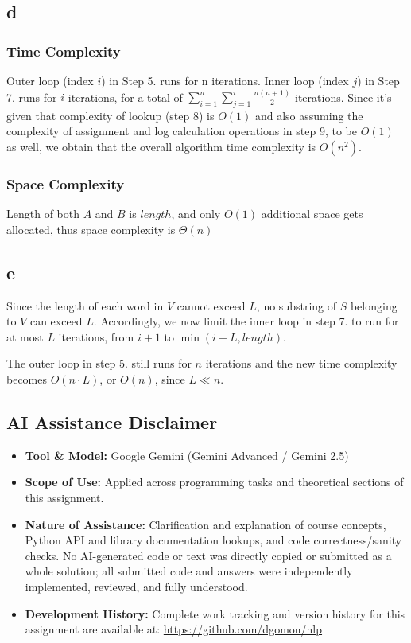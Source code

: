 \documentclass{article}
\numberwithin{equation}{section}
\begin{document}
    \subsection*{d}
    \subsubsection*{Time Complexity}
    Outer loop (index $i$) in Step 5. runs for n iterations.
    Inner loop (index $j$) in Step 7. runs for $i$ iterations, for a total of $\sum_{i = 1}^{n}\sum_{j = 1}^{i} \frac{n(n+1)}{2}$ iterations.
    Since it's given that complexity of lookup (step 8) is $O(1)$ and also assuming the complexity of assignment and
    log calculation operations in step 9, to be $O(1)$ as well, we obtain that the overall algorithm time complexity is $O(n^2)$.

    \subsubsection*{Space Complexity}
    Length of both $A$ and $B$ is $length$, and only $O(1)$ additional space gets allocated, thus space complexity is $\Theta(n)$

    \subsection*{e}
    Since the length of each word in $V$ cannot exceed $L$, no substring of $S$ belonging to $V$ can exceed $L$.
    Accordingly, we now limit the inner loop in step 7. to run for at most $L$ iterations, from $i + 1$ to $\min(i + L, length)$.

    The outer loop in step 5. still runs for $n$ iterations and the new time complexity becomes $O(n \cdot L)$, or $O(n)$, since $L \ll n$.


    \subsection*{AI Assistance Disclaimer}
    \begin{itemize}
    \item \textbf{Tool \& Model:} Google Gemini (Gemini Advanced / Gemini 2.5)
    \item \textbf{Scope of Use:} Applied across programming tasks and theoretical sections of this assignment.
    \item \textbf{Nature of Assistance:} Clarification and explanation of course concepts, Python API and library documentation lookups, and code correctness/sanity checks. No AI-generated code or text was directly copied or submitted as a whole solution; all submitted code and answers were independently implemented, reviewed, and fully understood.
    \item \textbf{Development History:} Complete work tracking and version history for this assignment are available at: \href{https://github.com/dgomon/nlp}{https://github.com/dgomon/nlp}
    \end{itemize}
\end{document}

